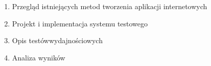 \begin{enumerate}
 \item Przegląd istniejących metod tworzenia aplikacji internetowych
 \item Projekt i implementacja systemu testowego
 \item Opis testówwydajnościowych
 \item Analiza wyników
\end{enumerate}
